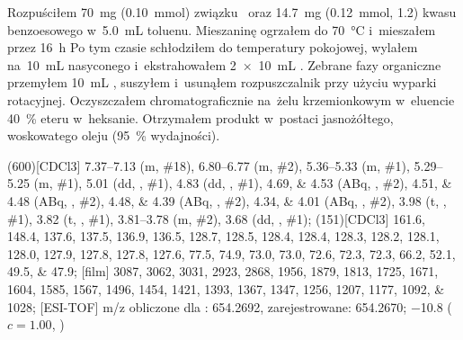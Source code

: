 Rozpuściłem \SI{70}{\milli\gram} (\SI{0.10}{\milli\mol}) związku~ oraz
	\SI{14.7}{\milli\gram} (\SI{0.12}{\milli\mol}, \SI{1.2}{\equiv}) kwasu benzoesowego
	w~\SI{5.0}{\milli\liter} toluenu.
Mieszaninę ogrzałem do \SI{70}{\degreeCelsius} i~mieszałem przez \SI{16}{\hour}
Po tym czasie schłodziłem do temperatury pokojowej, wylałem na~\SI{10}{\milli\liter} nasyconego
	 i~ekstrahowałem \SI[product-units = single]{2 x 10}{\mL} .
Zebrane fazy organiczne przemyłem \SI{10}{\mL} , suszyłem  i~usunąłem
	rozpuszczalnik przy użyciu wyparki rotacyjnej.
Oczyszczałem chromatograficznie na~żelu krzemionkowym w~eluencie \SI{40}{\percent} eteru  w~heksanie.
Otrzymałem produkt w~postaci jasnożółtego, woskowatego oleju (\SI{95}{\percent} wydajności).

\begin{fullexp}
	\NMR(600)[CDCl3] \numrange{7.37}{7.13} (m, \#{18}), \numrange{6.80}{6.77} (m, \#{2}), \numrange{5.36}{5.33} (m, \#{1}), \numrange{5.29}{5.25} (m, \#{1}), \num{5.01} (dd, , \#{1}), \num{4.83} (dd, , \#{1}), \numlist{4.69;4.53} (ABq, , \#{2}), \numlist{4.51;4.48} (ABq, , \#{2}), \numlist{4.48;4.39} (ABq, , \#{2}), \numlist{4.34;4.01} (ABq, , \#{2}), \num{3.98} (t, , \#{1}), \num{3.82} (t, , \#{1}), \numrange{3.81}{3.78} (m, \#{2}), \num{3.68} (dd, , \#{1});
	(151)[CDCl3] \numlist{161.6; 148.4; 137.6; 137.5; 136.9; 136.5; 128.7; 128.5; 128.4; 128.4; 128.3; 128.2; 128.1; 128.0; 127.9; 127.8; 127.8; 127.6; 77.5; 74.9; 73.0; 73.0; 72.6; 72.3; 72.3; 66.2; 52.1; 49.5; 47.9};
	[film] \numlist{3087; 3062; 3031; 2923; 2868; 1956; 1879; 1813; 1725; 1671; 1604; 1585; 1567; 1496; 1454; 1421; 1393; 1367; 1347; 1256; 1207; 1177; 1092; 1028};
	[ESI-TOF] m/z obliczone dla : \num{654.2692}, zarejestrowane: \num{654.2670};
	\data{[$\alpha^{23}_D$]~$=$} \num{-10.8} ($c = 1.00$, )
\end{fullexp}

